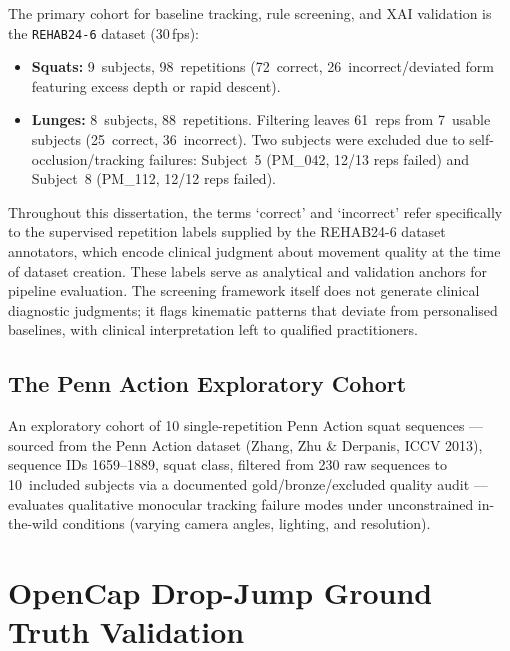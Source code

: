 The primary cohort for baseline tracking, rule screening, and XAI validation is the \texttt{REHAB24-6} dataset (30\,fps):
\begin{itemize}
  \item \textbf{Squats:} 9~subjects, 98~repetitions (72~correct, 26~incorrect/deviated form featuring excess depth or rapid descent).
  \item \textbf{Lunges:} 8~subjects, 88~repetitions. Filtering leaves 61~reps from 7~usable subjects (25~correct, 36~incorrect). Two subjects were excluded due to self-occlusion/tracking failures: Subject~5 (PM\_042, 12/13 reps failed) and Subject~8 (PM\_112, 12/12 reps failed).
\end{itemize}
Throughout this dissertation, the terms `correct' and `incorrect' refer specifically to the supervised repetition labels supplied by the REHAB24-6 dataset annotators, which encode clinical judgment about movement quality at the time of dataset creation. These labels serve as analytical and validation anchors for pipeline evaluation. The screening framework itself does not generate clinical diagnostic judgments; it flags kinematic patterns that deviate from personalised baselines, with clinical interpretation left to qualified practitioners.

\subsection{The Penn Action Exploratory Cohort}
\label{sec:penn-cohort}

An exploratory cohort of 10 single-repetition Penn Action squat sequences \citep{Zhang_Penn_Action_2013} --- sourced from the Penn Action dataset (Zhang, Zhu \& Derpanis, ICCV 2013), sequence IDs 1659--1889, squat class, filtered from 230 raw sequences to 10~included subjects via a documented gold/bronze/excluded quality audit --- evaluates qualitative monocular tracking failure modes under unconstrained in-the-wild conditions (varying camera angles, lighting, and resolution).


\section{OpenCap Drop-Jump Ground Truth Validation}
\label{sec:dropjump-validation}

